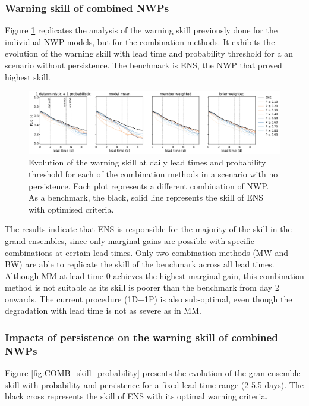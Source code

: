 \documentclass{ametsocV6.1}
\begin{document}
\subsubsection{Warning skill of combined NWPs}
\label{sec:COMB_skill}

Figure \ref{fig:COMB_skill_leadtime} replicates the analysis of the warning skill previously done for the individual NWP models, but for the combination methods. It exhibits the evolution of the warning skill with lead time and probability threshold for a an scenario without persistence. The benchmark is ENS, the NWP that proved highest skill.

\begin{figure}[ht]
    \centering
    \includegraphics[width=1\textwidth]{figure05.pdf}
    \caption{Evolution of the warning skill at daily lead times and probability threshold for each of the combination methods in a scenario with no persistence. Each plot represents a different combination of NWP. As a benchmark, the black, solid line represents the skill of ENS with optimised criteria.}
    \label{fig:COMB_skill_leadtime}
\end{figure}

The results indicate that ENS is responsible for the majority of the skill in the grand ensembles, since only marginal gains are possible with specific combinations at certain lead times. Only two combination methods (MW and BW) are able to replicate the skill of the benchmark across all lead times. Although MM at lead time 0 achieves the highest marginal gain, this combination method is not suitable as its skill is poorer than the benchmark from day 2 onwards. The current procedure (1D+1P) is also sub-optimal, even though the degradation with lead time is not as severe as in MM.

\subsubsection{Impacts of persistence on the warning skill of combined NWPs}
\label{sec:COMB_persistence}

Figure \ref{fig:COMB_skill_probability} presents the evolution of the gran ensemble skill with probability and persistence for a fixed lead time range (2-5.5 days). The black cross represents the skill of ENS with its optimal warning criteria.
\end{document}
